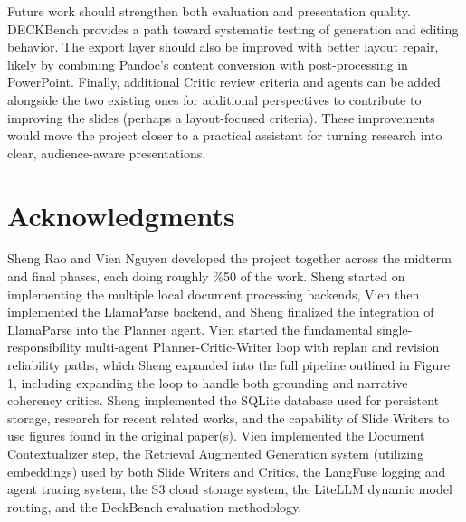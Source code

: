 \documentclass[11pt]{article}
\begin{document}
Future work should strengthen both evaluation and presentation quality. DECKBench provides a path toward systematic testing of generation and editing behavior. The export layer should also be improved with better layout repair, likely by combining Pandoc's content conversion with post-processing in PowerPoint. Finally, additional Critic review criteria and agents can be added alongside the two existing ones for additional perspectives to contribute to improving the slides (perhaps a layout-focused criteria). These improvements would move the project closer to a practical assistant for turning research into clear, audience-aware presentations.

\section*{Acknowledgments}

Sheng Rao and Vien Nguyen developed the project together across the midterm and final phases, each doing roughly \%50 of the work. Sheng started on implementing the multiple local document processing backends, Vien then implemented the LlamaParse backend, and Sheng finalized the integration of LlamaParse into the Planner agent.  Vien started the fundamental single-responsibility multi-agent Planner-Critic-Writer loop with replan and revision reliability paths, which Sheng expanded into the full pipeline outlined in Figure 1, including expanding the loop to handle both grounding and narrative coherency critics.  Sheng implemented the SQLite database used for persistent storage, research for recent related works, and the capability of Slide Writers to use figures found in the original paper(s).  Vien implemented the Document Contextualizer step, the Retrieval Augmented Generation system (utilizing embeddings) used by both Slide Writers and Critics, the LangFuse logging and agent tracing system, the S3 cloud storage system, the LiteLLM dynamic model routing, and the DeckBench evaluation methodology.

%

\end{document}
